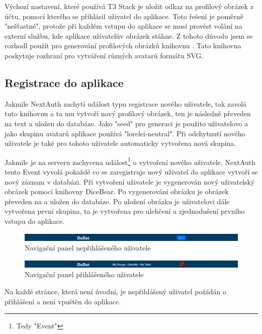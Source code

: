Výchozí nastavení, které používá T3 Stack je uložit odkaz na profilový obrázek z účtu, pomocí kterého se přihlásil uživatel do aplikace. Toto řešení je poměrně "nešťastné", protože při každém vstupu do aplikace se musí provést volání na externí službu, kde aplikace uživatelův obrázek stáhne. Z tohoto důvodu jsem se rozhodl použít pro generování profilových obrázků knihovnu \cite{dicebear}. Tato knihovna poskytuje rozhraní pro vytváření různých avatarů formátu SVG.

\subsection{Registrace do aplikace}
Jakmile NextAuth zachytí událost typu registrace nového uživatele, tak zavolá tuto knihovnu a ta mu vytvoří nový profilový obrázek, ten je následně převeden na text a uložen do databáze. Jako "seed" pro generaci je použito uživatelovo  a jako skupinu avatarů aplikace používá "lorelei-neutral"\cite{lorelei-neutral}. Při odchytnutí nového uživatele je také pro tohoto uživatele automaticky vytvořena nová skupina.

Jakmile je na serveru zachycena událost\footnote{Tedy "Event"} o vytvoření nového uživatele, NextAuth tento Event vyvolá pokaždé co se zaregistruje nový uživatel do aplikace vytvoří se nový záznam v databázi. Při vytvoření uživatele je vygenerován nový uživatelský obrázek pomocí knihovny DiceBear. Po vygenerování obrázku je obrázek převeden na  a uložen do databáze. Po uložení obrázku je uživatelovi dále vytvořena první skupina, ta je vytvořena pro ulehčení a zjednodušení prvního vstupu do aplikace.

\begin{figure}[hbt!]
	\includegraphics[width=1\linewidth]{img/neprihlasenyNavbar.png}
	\caption{Navigační panel nepřihlášeného uživatele}
\end{figure}
\begin{figure}[hbt!]
	\includegraphics[width=1\linewidth]{img/prihlasenyNavbar.png}
	\caption{Navigační panel přihlášeného uživatele}
\end{figure}
\clearpage
Na každé stránce, která není úvodní, je nepřihlášený uživatel požádán o přihlášení a není vpuštěn do aplikace.

